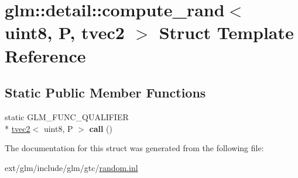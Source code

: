 \hypertarget{structglm_1_1detail_1_1compute__rand_3_01uint8_00_01_p_00_01tvec2_01_4}{\section{glm\-:\-:detail\-:\-:compute\-\_\-rand$<$ uint8, P, tvec2 $>$ Struct Template Reference}
\label{structglm_1_1detail_1_1compute__rand_3_01uint8_00_01_p_00_01tvec2_01_4}
}
\subsection*{Static Public Member Functions}
\begin{DoxyCompactItemize}
\item 
\hypertarget{structglm_1_1detail_1_1compute__rand_3_01uint8_00_01_p_00_01tvec2_01_4_aa2d8c5aa8c17ad7e38dfbf9460bde2f5}{static G\-L\-M\-\_\-\-F\-U\-N\-C\-\_\-\-Q\-U\-A\-L\-I\-F\-I\-E\-R \\*
\hyperlink{structglm_1_1tvec2}{tvec2}$<$ uint8, P $>$ {\bfseries call} ()}\label{structglm_1_1detail_1_1compute__rand_3_01uint8_00_01_p_00_01tvec2_01_4_aa2d8c5aa8c17ad7e38dfbf9460bde2f5}

\end{DoxyCompactItemize}


The documentation for this struct was generated from the following file\-:\begin{DoxyCompactItemize}
\item 
ext/glm/include/glm/gtc/\hyperlink{random_8inl}{random.\-inl}\end{DoxyCompactItemize}
